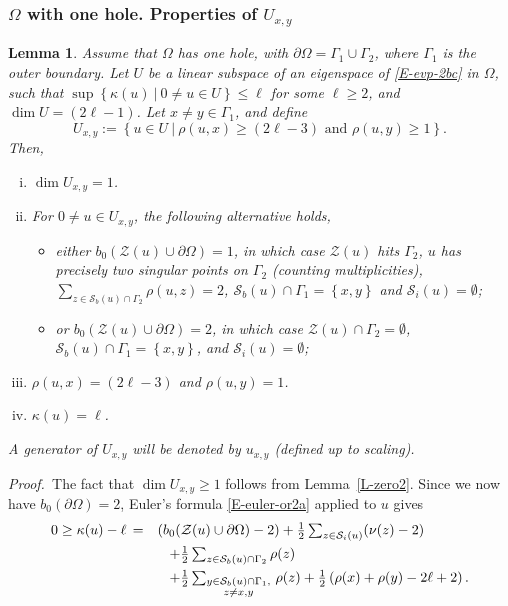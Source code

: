 \documentclass[12pt,a4paper]{amsart}
\theoremstyle{plain} %
\newtheorem{lemma}[theorem]{Lemma}
\theoremstyle{definition}
\numberwithin{equation}{section}
\numberwithin{figure}{section}
\numberwithin{table}{section}
\newcommand{\cS}{\mathcal{S}}
\newcommand{\cZ}{\mathcal{Z}}
\newcommand{\pf}{\emph{Proof.~}}
\newcommand{\set}[1]{\left\lbrace #1 \right\rbrace}
\begin{document}
{\subsubsection{$\Omega$ with one hole. Properties of $U_{x,y}$}\label{SSS-hmn-21c}

\begin{lemma}\label{L-Uxy1}
Assume that $\Omega$ has one hole, with $\partial \Omega =\Gamma_1 \cup \Gamma_2$,  where $\Gamma_1$ is  the  outer boundary.  Let $U$ be a linear subspace of an eigenspace of \eqref{E-evp-2bc} in $\Omega$,  such that $\sup\set{\kappa(u) ~|~ 0 \not = u \in U}\le \ell$ for some $\ell \ge 2$, and $\dim U = (2\ell-1)$. Let $x \neq y \in \Gamma_1$, and define
$$U_{x,y} := \set{u \in U ~|~ \rho(u,x) \ge (2\ell - 3) \text{~and~} \rho(u,y) \ge 1}.$$ Then,
\begin{enumerate}[(i)]
  \item $\dim U_{x,y} = 1$.
  \item  For $0 \neq u \in U_{x,y}$, the following alternative holds,
  \begin{itemize}
    \item[$\diamond$] either $b_0(\cZ(u) \cup \partial\Omega) = 1$, in which case $\cZ(u)$ hits $\Gamma_2$, $u$ has precisely two singular points on $\Gamma_2$ (counting multiplicities), $\sum_{z \in \cS_b(u) \cap \Gamma_2} \rho (u,z) = 2$,
$\cS_b(u) \cap \Gamma_1 = \set{x,y}$ and $\cS_i(u) = \emptyset$;
    \item[$\diamond$] or $b_0(\cZ(u) \cup \partial\Omega) = 2$, in which case $\cZ(u) \cap \Gamma_2 = \emptyset$,
$\cS_b(u) \cap \Gamma_1 = \set{x,y}$, and $\cS_i(u) = \emptyset$;
\end{itemize}

\item $\rho(u,x)=(2\ell-3)$ and $\rho(u,y) = 1$.
\item $\kappa(u) = \ell$.
\end{enumerate}
A generator of $U_{x,y}$ will be denoted by  $u_{x,y}$ (defined up to scaling).
\end{lemma}%

\pf The fact that $\dim U_{x,y}\ge 1$ follows from Lemma~\ref{L-zero2}. Since we now have $b_0(\partial \Omega)=2$, Euler's formula \eqref{E-euler-or2a} applied to $u$ gives
%
\begin{equation}\label{E-A6}
\begin{array}{ll}
0 \geq \kappa(u) - \ell  \,  = & \left( b_0(\cZ(u)\cup \partial \Omega) -2\right) + \frac 12 \sum_{z\in \cS_i(u)} (\nu(z)-2)\\[5pt]
& \hspace{3mm}+ \frac 12 \sum_{z \in \cS_b(u) \cap \Gamma_2} \rho (z)\\[5pt]
& \hspace{3mm}+ \frac 12 \sum_{\substack{y\in \cS_b(u) \cap \Gamma_1,\\ z \neq x,y}\,}
\rho (z) + \frac 12 \left( \rho(x) + \rho(y) -2 \ell +2\right).
 \end{array}
\end{equation}

}
\end{document}
